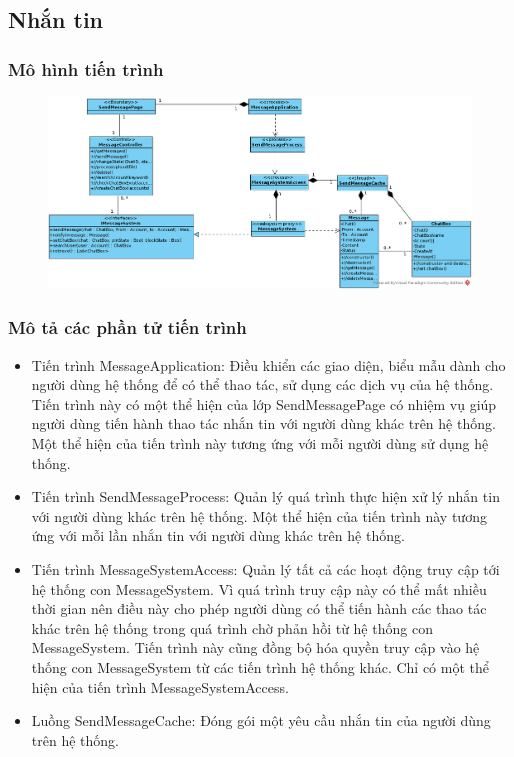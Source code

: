 \documentclass[./../main.tex]{subfiles}
\begin{document}
\subsection{Nhắn tin}

\subsubsection{Mô hình tiến trình}

\begin{figure}[H]
	\centering
	\includegraphics[width=\linewidth]{./images/pv_Message.png}
\end{figure}

\subsubsection{Mô tả các phần tử tiến trình}
\begin{itemize}
	\item Tiến trình MessageApplication: Điều khiển các giao diện, biểu mẫu dành cho người dùng hệ thống để có thể thao tác, sử dụng các dịch vụ của hệ thống. Tiến trình này có một thể hiện của lớp SendMessagePage có nhiệm vụ giúp người dùng tiến hành thao tác nhắn tin với người dùng khác trên hệ thống.
	Một thể hiện của tiến trình này tương ứng với mỗi người dùng sử dụng hệ thống.
	\item Tiến trình SendMessageProcess: Quản lý quá trình thực hiện xử lý nhắn tin với người dùng khác trên hệ thống.
	Một thể hiện của tiến trình này tương ứng với mỗi lần nhắn tin với người dùng khác trên hệ thống.
	\item Tiến trình MessageSystemAccess: Quản lý tất cả các hoạt động truy cập tới hệ thống con MessageSystem. Vì quá trình truy cập này có thể mất nhiều thời gian nên điều này cho phép người dùng có thể tiến hành các thao tác khác trên hệ thống trong quá trình chờ phản hồi từ hệ thống con MessageSystem. Tiến trình này cũng đồng bộ hóa quyền truy cập vào hệ thống con MessageSystem từ các tiến trình hệ thống khác.
	Chỉ có một thể hiện của tiến trình MessageSystemAccess.
	\item Luồng SendMessageCache: Đóng gói một yêu cầu nhắn tin của người dùng trên hệ thống.
\end{itemize}
\end{document}
